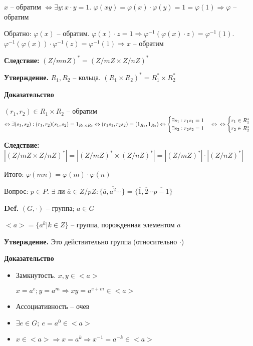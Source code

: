 \documentclass[14pt, letter paper]{article}
\begin{document}
$x$ -- обратим $\Leftrightarrow \exists y : x \cdot y = 1$. $\varphi(xy) = \varphi(x) \cdot \varphi(y) = 1 = \varphi(1) \Rightarrow \varphi$ -- обратим

Обратно: $\varphi(x)$ -- обратим. $\varphi(x) \cdot z = 1 \Rightarrow \varphi^{-1}(\varphi(x) \cdot z) = \varphi^{-1}(1)$. $\varphi^{-1}(\varphi(x)) \cdot \varphi^{-1}(z) = \varphi^{-1}(1) \Rightarrow x$ -- обратим

\textbf{Следствие:} $(Z/mnZ)^* = (Z/mZ \times Z/nZ)^*$

\textbf{Утверждение.} $R_1, R_2$ -- кольца. $(R_1 \times R_2)^* = R_1^* \times R_2^*$

\begin{center}
    \textbf{Доказательство}
\end{center}

$(r_1, r_2) \in R_1 \times R_2$ -- обратим $\Leftrightarrow \exists (s_1, s_2) : (r_1, r_2)(s_1, s_2) = 1_{R_1 \times R_2} \Leftrightarrow (r_1s_1, r_2s_2) = (1_{R_1}, 1_{R_2}) \Leftrightarrow \begin{cases}
    \exists s_1 : r_1s_1 = 1 \\
    \exists s_2 : r_2s_2 = 1
\end{cases} \Leftrightarrow \\ \Leftrightarrow \begin{cases}
    r_1 \in R_1^* \\
    r_2 \in R_2^*
\end{cases}$

\textbf{Следствие:} $|(Z/mZ \times Z/nZ)^*| = |(Z/mZ)^* \times (Z/nZ)^*| = |(Z/mZ)^*| \cdot |(Z/nZ)^*|$

Итого: $\varphi(mn) = \varphi(m) \cdot \varphi(n)$

\vspace{5mm}

Вопрос: $p \in P$. $\exists$ ли $\overline{a} \in Z/pZ : \{\overline{a}, \overline{a^2} \cdots\} = \{\overline{1}, \overline{2} \cdots \overline{p-1}\}$

\textbf{Def.} $(G, \cdot)$ -- группа; $a \in G$

$<a> = \{ a^k| k \in Z\}$ -- группа, порожденная элементом $a$

\textbf{Утверждение.} Это действительно группа (относительно $\cdot$)

\begin{center}
    \textbf{Доказательство}
\end{center}

\begin{itemize}
    \item Замкнутость. $x, y \in <a>$

    $x = a^e; y = a^m \Rightarrow xy = a^{e+m} \in <a>$

    \item Ассоциативность -- очев

    \item $\exists e \in G;\ e = a^0 \in <a>$

    \item $x \in <a> \Rightarrow x = a^k \Rightarrow x^{-1} = a^{-k} \in <a>$
\end{itemize}
\end{document}
